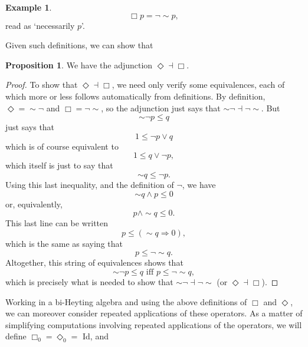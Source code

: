 \documentclass[a4paper]{book}
\theoremstyle{definition}
\newtheorem{example}{Example}[section]
\theoremstyle{definition}
\theoremstyle{definition}
\newtheorem{proposition}{Proposition}[section]
\theoremstyle{theorem}
\theoremstyle{definition}
\begin{document}
\begin{example}
	\begin{equation*} 
	\Box p = \neg \sim p,
	\end{equation*} read as `necessarily $p$'. \par 
	Given such definitions, we can show that
	\begin{proposition}
		We have the adjunction $\Diamond \dashv \Box$. 
	\end{proposition} 
	\begin{proof}
		To show that $\Diamond \dashv \Box$, we need only verify some equivalences, each of which more or less follows automatically from definitions. By definition, $\Diamond = \sim \neg$ and $\Box = \neg \sim$, so the adjunction just says that $\sim \neg \dashv \neg \sim$. But 
		\begin{equation*}
		\sim \neg p \leq q
		\end{equation*}
		just says that 
		\begin{equation*}
		1 \leq \neg p \vee q
		\end{equation*}
		which is of course equivalent to 
		\begin{equation*}
		1 \leq q \vee \neg p, 
		\end{equation*}
		which itself is just to say that 
		\begin{equation*}
		\sim q \leq \neg p.
		\end{equation*}
		Using this last inequality, and the definition of $\neg$, we have 
		\begin{equation*}
		\sim q \wedge p \leq 0
		\end{equation*}
		or, equivalently, 
		\begin{equation*}
		p \wedge \sim q \leq 0. 
		\end{equation*}
		This last line can be written 
		\begin{equation*}
		p \leq (\sim q \Rightarrow 0),
		\end{equation*}
		which is the same as saying that 
		\begin{equation*}
		p \leq \neg \sim q. 
		\end{equation*}
		Altogether, this string of equivalences shows that 
		\begin{equation}
		\sim \neg p \leq q \text{ iff } p \leq \neg \sim q,
		\end{equation}
		which is precisely what is needed to show that $\sim \neg \dashv \neg \sim$ (or $\Diamond \dashv \Box$). 
	\end{proof}
	Working in a bi-Heyting algebra and using the above definitions of $\Box$ and $\Diamond$, we can moreover consider repeated applications of these operators. As a matter of simplifying computations involving repeated applications of the operators, we will define $\Box_0 = \Diamond_0 = $ Id, and

\end{example}
\end{document}
